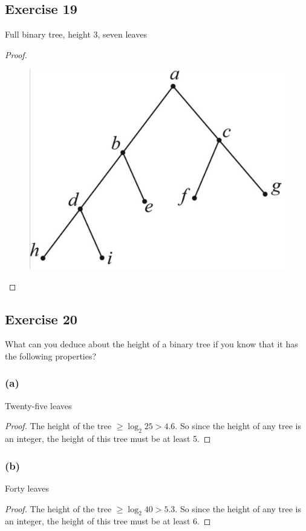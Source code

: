 \documentclass[14pt]{extarticle}
\begin{document}
\subsection{Exercise 19}
Full binary tree, height 3, seven leaves
\begin{proof}
\begin{figure}[ht!]
\centering
\includegraphics[scale=0.15]{../images/10.5.16.png}
\end{figure}
\end{proof}

\subsection{Exercise 20}
What can you deduce about the height of a binary tree if you know that it has the following properties?

\subsubsection{(a)}
Twenty-five leaves
\begin{proof}
The height of the tree \(\geq \log_2 25 > 4.6\). So since the height of any tree is an integer, the height of this tree must 
be at least 5.
\end{proof}

\subsubsection{(b)}
Forty leaves
\begin{proof}
The height of the tree \(\geq \log_2 40 > 5.3\). So since the height of any tree is an integer, the height of this tree must 
be at least 6.
\end{proof}
\end{document}
